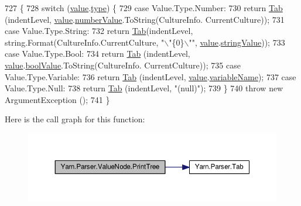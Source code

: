 \begin{DoxyCode}
727             \{
728                 \textcolor{keywordflow}{switch} (\hyperlink{a00190_a51ab5939344f9bfa21181c02cf0e341d}{value}.\hyperlink{a00189_a6d5820fafa766911b9da84d1ed33e51a}{type}) \{
729                 \textcolor{keywordflow}{case} Value.Type.Number:
730                     \textcolor{keywordflow}{return} \hyperlink{a00151_aa8fa36b46de12a1c561d77b99c4b9ae3}{Tab} (indentLevel, \hyperlink{a00190_a51ab5939344f9bfa21181c02cf0e341d}{value}.\hyperlink{a00189_ae1892c1c7a8177537d1caa39a2e51da6}{numberValue}.ToString(CultureInfo.
      CurrentCulture));
731                 \textcolor{keywordflow}{case} Value.Type.String:
732                     \textcolor{keywordflow}{return} \hyperlink{a00151_aa8fa36b46de12a1c561d77b99c4b9ae3}{Tab}(indentLevel, \textcolor{keywordtype}{string}.Format(CultureInfo.CurrentCulture, \textcolor{stringliteral}{"\(\backslash\)"\{0\}\(\backslash\)""}, 
      \hyperlink{a00190_a51ab5939344f9bfa21181c02cf0e341d}{value}.\hyperlink{a00189_add1b07146f1a9e4b655b33c93d07dff9}{stringValue}));
733                 \textcolor{keywordflow}{case} Value.Type.Bool:
734                     \textcolor{keywordflow}{return} \hyperlink{a00151_aa8fa36b46de12a1c561d77b99c4b9ae3}{Tab} (indentLevel, \hyperlink{a00190_a51ab5939344f9bfa21181c02cf0e341d}{value}.\hyperlink{a00189_acb140e3466e132528409d4c441fd67da}{boolValue}.ToString(CultureInfo.
      CurrentCulture));
735                 \textcolor{keywordflow}{case} Value.Type.Variable:
736                     \textcolor{keywordflow}{return} \hyperlink{a00151_aa8fa36b46de12a1c561d77b99c4b9ae3}{Tab} (indentLevel, \hyperlink{a00190_a51ab5939344f9bfa21181c02cf0e341d}{value}.\hyperlink{a00189_a8ee2b09b7d28eaf97bf63c74d0023bfd}{variableName});
737                 \textcolor{keywordflow}{case} Value.Type.Null:
738                     \textcolor{keywordflow}{return} \hyperlink{a00151_aa8fa36b46de12a1c561d77b99c4b9ae3}{Tab} (indentLevel, \textcolor{stringliteral}{"(null)"});
739                 \}
740                 \textcolor{keywordflow}{throw} \textcolor{keyword}{new} ArgumentException ();
741             \}
\end{DoxyCode}


Here is the call graph for this function\-:
\nopagebreak
\begin{figure}[H]
\begin{center}
\leavevmode
\includegraphics[width=350pt]{a00190_ae4659e4431e9846a45e0d048c960781a_cgraph}
\end{center}
\end{figure}


